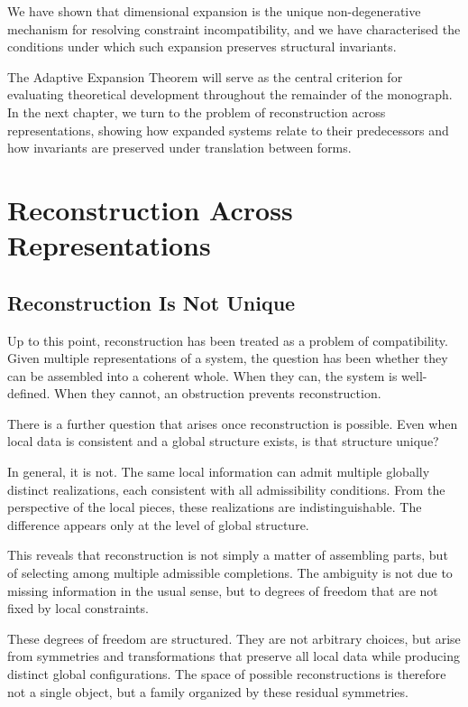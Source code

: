 \documentclass[11pt,openany]{book}
\begin{document}
We have shown that dimensional expansion is the unique
non-degenerative mechanism for resolving constraint
incompatibility, and we have characterised the conditions
under which such expansion preserves structural invariants.

The Adaptive Expansion Theorem will serve as the central
criterion for evaluating theoretical development throughout
the remainder of the monograph. In the next chapter, we
turn to the problem of reconstruction across representations,
showing how expanded systems relate to their predecessors
and how invariants are preserved under translation between
forms.


\chapter{Reconstruction Across Representations}
\label{ch:reconstruction}

\section*{ Reconstruction Is Not Unique}

Up to this point, reconstruction has been treated as a problem of compatibility. Given multiple representations of a system, the question has been whether they can be assembled into a coherent whole. When they can, the system is well-defined. When they cannot, an obstruction prevents reconstruction.

There is a further question that arises once reconstruction is possible. Even when local data is consistent and a global structure exists, is that structure unique?

In general, it is not. The same local information can admit multiple globally distinct realizations, each consistent with all admissibility conditions. From the perspective of the local pieces, these realizations are indistinguishable. The difference appears only at the level of global structure.

This reveals that reconstruction is not simply a matter of assembling parts, but of selecting among multiple admissible completions. The ambiguity is not due to missing information in the usual sense, but to degrees of freedom that are not fixed by local constraints.

These degrees of freedom are structured. They are not arbitrary choices, but arise from symmetries and transformations that preserve all local data while producing distinct global configurations. The space of possible reconstructions is therefore not a single object, but a family organized by these residual symmetries.
\end{document}
